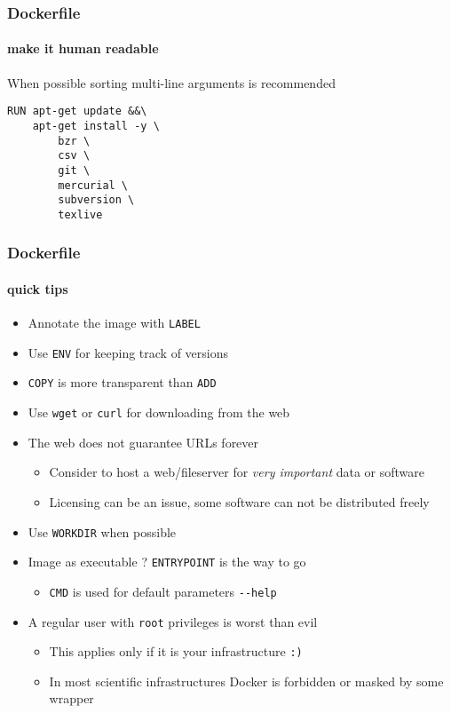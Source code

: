 \begin{frame}[fragile]
\frametitle{Dockerfile}
\framesubtitle{make it human readable}

When possible sorting multi-line arguments is recommended

\begin{lstlisting}
RUN apt-get update &&\
    apt-get install -y \
	    bzr \
		csv \
		git \
		mercurial \
		subversion \
		texlive
\end{lstlisting}
\end{frame}


\begin{frame}[fragile]
\frametitle{Dockerfile}
\framesubtitle{quick tips}

\begin{itemize}
\item Annotate the image with \lstinline!LABEL!
\item Use \lstinline!ENV! for keeping track of versions
\item \lstinline!COPY! is more transparent than \lstinline!ADD!
\item Use \lstinline!wget! or \lstinline!curl! for downloading from the web
\item The web does not guarantee URLs forever
  \begin{itemize}
  \item Consider to host a web/fileserver for \textit{very important} data or software
  \item Licensing can be an issue, some software can not be distributed freely
  \end{itemize}
\item Use \lstinline!WORKDIR! when possible
\item Image as executable ? \lstinline!ENTRYPOINT! is the way to go
  \begin{itemize}
  \item \lstinline!CMD! is used for default parameters \lstinline!--help!
  \end{itemize}
\item A regular user with \lstinline!root! privileges is worst than evil
  \begin{itemize}
  \item This applies only if it is your infrastructure \lstinline!:)!
  \item In most scientific infrastructures Docker is forbidden or masked by some wrapper
  \end{itemize}
\end{itemize}
\end{frame}
 
